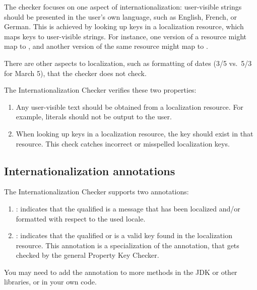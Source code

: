The checker focuses on one aspect of internationalization:  user-visible strings
should be presented in the user's own language, such as English, French, or
German.  This is achieved by looking up keys in a localization resource,
which maps keys to user-visible strings.  For instance, one version of a
resource might map  to
, and another version of the same resource might map
 to .

There are other aspects to localization, such as formatting of dates (3/5
vs.~5/3 for March 5), that the checker does not check.

The Internationalization Checker verifies these two properties:

\begin{enumerate}

\item
  Any user-visible text should be obtained from a localization resource.
  For example,  literals should not be output to the user.

\item
  When looking up keys in a localization resource, the key should exist in
  that resource.  This check catches incorrect or misspelled localization
  keys.

\end{enumerate}


\subsection{Internationalization annotations\label{i18n-annotations}}

The Internationalization Checker supports two annotations:

\begin{enumerate}
\item {}: indicates that the qualified
 is a message that has been localized and/or formatted with
respect to the used locale.

\item {}: indicates that the
qualified  or  is a valid key found in the
localization resource.
This annotation is a specialization of the  annotation, that
gets checked by the general Property Key Checker.
\end{enumerate}

You may need to add the  annotation to more methods in the
JDK or other libraries, or in your own code.


